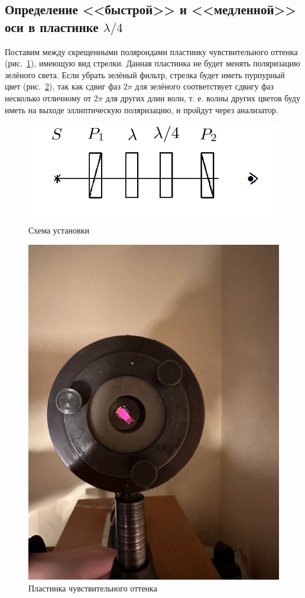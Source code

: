 \documentclass[a4paper, 12pt]{article}
\begin{document}
\subsection{Определение <<быстрой>> и <<медленной>> оси в пластинке $\lambda/4$}

Поставим между скрещенными поляроидами пластинку чувствительного оттенка (рис.~\ref{fig:axes_scheme}), имеющую вид стрелки. Данная пластинка не будет менять поляризацию зелёного света. Если убрать зелёный фильтр, стрелка будет иметь пурпурный цвет (рис.~\ref{fig:axes_sensitive}), так как сдвиг фаз $2\pi$ для зелёного соответствует сдвигу фаз несколько отличному от $2\pi$ для других длин волн, т. е. волны других цветов буду иметь на выходе эллиптическую поляризацию, и пройдут через анализатор.

\begin{figure}[h!]
\begin{center}
   \includegraphics[width=0.7\linewidth]{axes_scheme.png}
\end{center}
\caption{Схема установки}
\label{fig:axes_scheme}
\end{figure}

\begin{figure}[h!]
\begin{center}
   \includegraphics[width=0.5\linewidth]{axes_sensitive.jpg}
\end{center}
\caption{Пластинка чувствительного оттенка}
\label{fig:axes_sensitive}
\end{figure}
\end{document}
